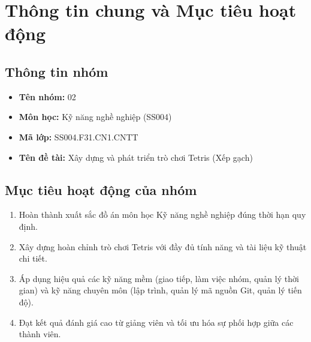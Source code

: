\section{Thông tin chung và Mục tiêu hoạt động}

\subsection{Thông tin nhóm}
\begin{itemize}[leftmargin=1.5cm]
    \item \textbf{Tên nhóm:} 02
    \item \textbf{Môn học:} Kỹ năng nghề nghiệp (SS004)
    \item \textbf{Mã lớp:} SS004.F31.CN1.CNTT
    \item \textbf{Tên đề tài:} Xây dựng và phát triển trò chơi Tetris (Xếp gạch)
\end{itemize}

\subsection{Mục tiêu hoạt động của nhóm}
\begin{enumerate}
    \item Hoàn thành xuất sắc đồ án môn học Kỹ năng nghề nghiệp đúng thời hạn quy định.
    \item Xây dựng hoàn chỉnh trò chơi Tetris với đầy đủ tính năng và tài liệu kỹ thuật chi tiết.
    \item Áp dụng hiệu quả các kỹ năng mềm (giao tiếp, làm việc nhóm, quản lý thời gian) và kỹ năng chuyên môn (lập trình, quản lý mã nguồn Git, quản lý tiến độ).
    \item Đạt kết quả đánh giá cao từ giảng viên và tối ưu hóa sự phối hợp giữa các thành viên.
\end{enumerate}
